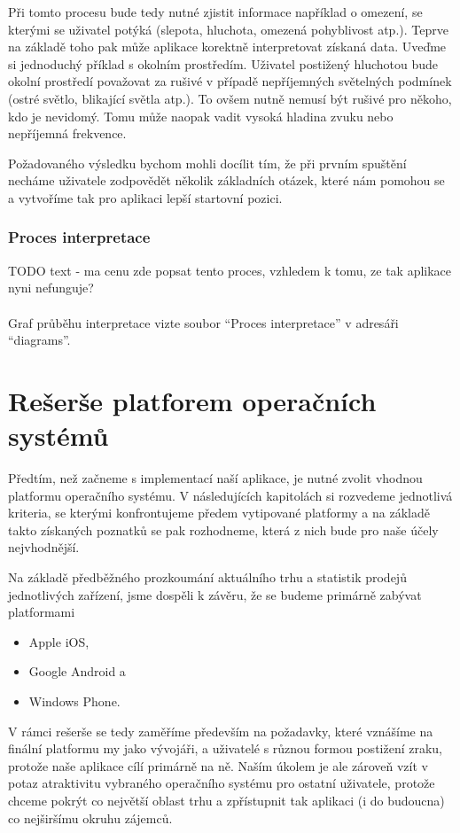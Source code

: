 \documentclass[thesis=M,czech]{FITthesis}[2012/06/26]
\begin{document}
Při tomto procesu bude tedy nutné zjistit informace například o omezení, se kterými se uživatel potýká (slepota, hluchota, omezená pohyblivost atp.). Teprve na základě toho pak může aplikace korektně interpretovat získaná data. Uveďme si jednoduchý příklad s okolním prostředím. Uživatel postižený hluchotou bude okolní prostředí považovat za rušivé v případě nepříjemných světelných podmínek (ostré světlo, blikající světla atp.). To ovšem nutně nemusí být rušivé pro někoho, kdo je nevidomý. Tomu může naopak vadit vysoká hladina zvuku nebo nepříjemná frekvence.

Požadovaného výsledku bychom mohli docílit tím, že při prvním spuštění necháme uživatele zodpovědět několik základních otázek, které nám pomohou se  a vytvoříme tak pro aplikaci lepší startovní pozici.

\subsubsection*{Proces interpretace}
TODO text - ma cenu zde popsat tento proces, vzhledem k tomu, ze tak aplikace nyni nefunguje?
\\\\
Graf průběhu interpretace vizte soubor “Proces interpretace” v adresáři “diagrams”.

\section{Rešerše platforem operačních systémů}
Předtím, než začneme s implementací naší aplikace, je nutné zvolit vhodnou platformu operačního systému. V následujících kapitolách si rozvedeme jednotlivá kriteria, se kterými konfrontujeme předem vytipované platformy a na základě takto získaných poznatků se pak rozhodneme, která z nich bude pro naše účely nejvhodnější.

Na základě předběžného prozkoumání aktuálního trhu a statistik prodejů jednotlivých zařízení, jsme dospěli k závěru, že se budeme primárně zabývat platformami

\begin{itemize}
\item    Apple iOS,
\item    Google Android a
\item    Windows Phone.
\end{itemize}

V rámci rešerše se tedy zaměříme především na požadavky, které vznášíme na finální platformu my jako vývojáři, a uživatelé s různou formou postižení zraku, protože naše aplikace cílí primárně na ně. Naším úkolem je ale zároveň vzít v potaz atraktivitu vybraného operačního systému pro ostatní uživatele, protože chceme pokrýt co největší oblast trhu a zpřístupnit tak aplikaci (i do budoucna) co nejširšímu okruhu zájemců.
\end{document}
